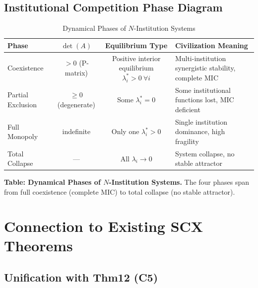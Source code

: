 \documentclass[12pt,a4paper]{article}
\theoremstyle{definition}
\newcommand{\lb}{\lambda}
\begin{document}
\subsection{Institutional Competition Phase Diagram}
\label{sec:competition_phase}

\begin{table}[htbp]
\centering
\caption{Dynamical Phases of $N$-Institution Systems}
\label{tab:competition_phases}
\begin{tabular}{@{}lccp{5cm}@{}}
\toprule
\textbf{Phase} &
\textbf{$\det(A)$} &
\textbf{Equilibrium Type} &
\textbf{Civilization Meaning} \\
\midrule
Coexistence &
$>0$ (P-matrix) &
Positive interior equilibrium $\lb_i^* > 0 \ \forall i$ &
Multi-institution synergistic stability, complete MIC \\
Partial Exclusion &
$\geq 0$ (degenerate) &
Some $\lb_i^* = 0$ &
Some institutional functions lost, MIC deficient \\
Full Monopoly &
indefinite &
Only one $\lb_i^* > 0$ &
Single institution dominance, high fragility \\
Total Collapse &
--- &
All $\lb_i \to 0$ &
System collapse, no stable attractor \\
\bottomrule
\end{tabular}
\end{table}

\noindent
\textbf{Table: Dynamical Phases of $N$-Institution Systems.} The four phases span from full coexistence (complete MIC) to total collapse (no stable attractor).

\section{Connection to Existing SCX Theorems}
\label{sec:connections}

\subsection{Unification with Thm12 (C5)}
\label{sec:thm12}
\end{document}

